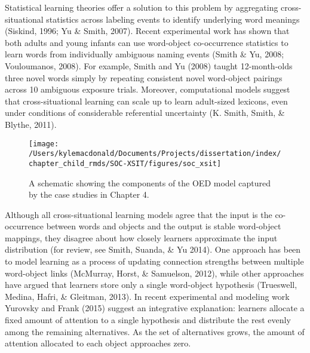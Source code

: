 \documentclass[oneside]{report}
\begin{document}
Statistical learning theories offer a solution to this problem by
aggregating cross-situational statistics across labeling events to
identify underlying word meanings (Siskind, 1996; Yu \& Smith, 2007).
Recent experimental work has shown that both adults and young infants
can use word-object co-occurrence statistics to learn words from
individually ambiguous naming events (Smith \& Yu, 2008; Vouloumanos,
2008). For example, Smith and Yu (2008) taught 12-month-olds three novel
words simply by repeating consistent novel word-object pairings across
10 ambiguous exposure trials. Moreover, computational models suggest
that cross-situational learning can scale up to learn adult-sized
lexicons, even under conditions of considerable referential uncertainty
(K. Smith, Smith, \& Blythe, 2011).
\begin{figure}[t]

{\centering \texttt{[image: /Users/kylemacdonald/Documents/Projects/dissertation/index/chapter\_child\_rmds/SOC-XSIT/figures/soc\_xsit]} 

}

\caption{A schematic showing the components of the OED model captured by the case studies in Chapter 4.}\label{fig:schematic-soc-xsit}
\end{figure}
Although all cross-situational learning models agree that the input is
the co-occurrence between words and objects and the output is stable
word-object mappings, they disagree about how closely learners
approximate the input distribution (for review, see Smith, Suanda, \& Yu
2014). One approach has been to model learning as a process of updating
connection strengths between multiple word-object links (McMurray,
Horst, \& Samuelson, 2012), while other approaches have argued that
learners store only a single word-object hypothesis (Trueswell, Medina,
Hafri, \& Gleitman, 2013). In recent experimental and modeling work
Yurovsky and Frank (2015) suggest an integrative explanation: learners
allocate a fixed amount of attention to a single hypothesis and
distribute the rest evenly among the remaining alternatives. As the set
of alternatives grows, the amount of attention allocated to each object
approaches zero.
\end{document}
